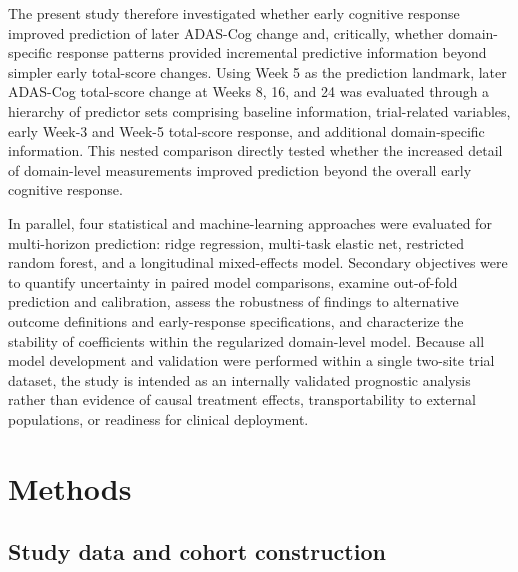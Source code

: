 \documentclass[11pt]{article}
\begin{document}
The present study therefore investigated whether early cognitive response improved
prediction of later ADAS-Cog change and, critically, whether domain-specific response
patterns provided incremental predictive information beyond simpler early total-score
changes. Using Week 5 as the prediction landmark, later ADAS-Cog total-score change
at Weeks 8, 16, and 24 was evaluated through a hierarchy of predictor sets comprising
baseline information, trial-related variables, early Week-3 and Week-5 total-score
response, and additional domain-specific information. This nested comparison directly
tested whether the increased detail of domain-level measurements improved prediction
beyond the overall early cognitive response.

In parallel, four statistical and machine-learning approaches were evaluated for
multi-horizon prediction: ridge regression, multi-task elastic net, restricted random
forest, and a longitudinal mixed-effects model. Secondary objectives were to quantify
uncertainty in paired model comparisons, examine out-of-fold prediction and
calibration, assess the robustness of findings to alternative outcome definitions and
early-response specifications, and characterize the stability of coefficients within the
regularized domain-level model. Because all model development and validation were
performed within a single two-site trial dataset, the study is intended as an internally
validated prognostic analysis rather than evidence of causal treatment effects,
transportability to external populations, or readiness for clinical deployment.

\section{Methods}

\subsection{Study data and cohort construction}
\end{document}

